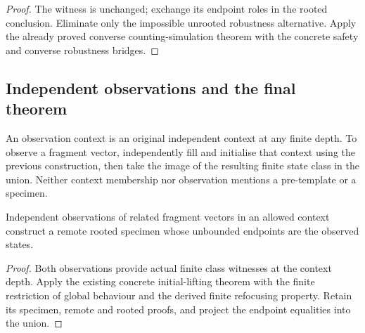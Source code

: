 \begin{proof}
The witness is unchanged; exchange its endpoint roles in the rooted conclusion. Eliminate only the impossible unrooted robustness alternative. Apply the already proved converse counting-simulation theorem with the concrete safety and converse robustness bridges.
\end{proof}




\subsection{Independent observations and the final theorem}



\begin{definition}
An observation context is an original independent context at any finite depth. To observe a fragment vector, independently fill and initialise that context using the previous construction, then take the image of the resulting finite state class in the union. Neither context membership nor observation mentions a pre-template or a specimen.
\end{definition}




\begin{lemma}
Independent observations of related fragment vectors in an allowed context construct a remote rooted specimen whose unbounded endpoints are the observed states.
\end{lemma}

\begin{proof}
Both observations provide actual finite class witnesses at the context depth. Apply the existing concrete initial-lifting theorem with the finite restriction of global behaviour and the derived finite refocusing property. Retain its specimen, remote and rooted proofs, and project the endpoint equalities into the union.
\end{proof}

